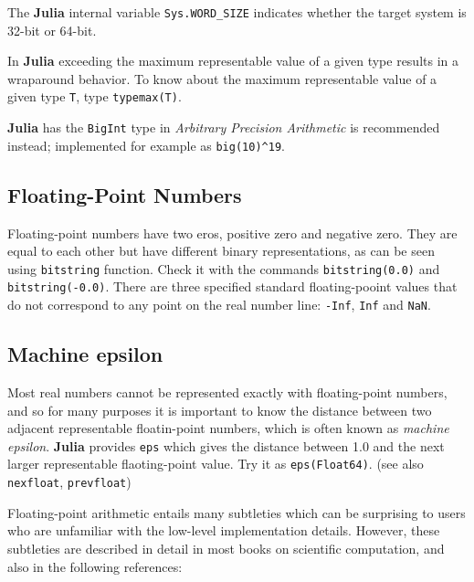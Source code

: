 \documentclass[
]{article}
\begin{document}
The \textbf{Julia} internal variable \texttt{Sys.WORD\_SIZE} indicates
whether the target system is 32-bit or 64-bit.

In \textbf{Julia} exceeding the maximum representable value of a given
type results in a wraparound behavior. To know about the maximum
representable value of a given type \texttt{T}, type
\texttt{typemax(T)}.

\textbf{Julia} has the \texttt{BigInt} type in \emph{Arbitrary Precision
Arithmetic} is recommended instead; implemented for example as
\texttt{big(10)\^{}19}.

\hypertarget{floating-point-numbers}{%
\subsection{Floating-Point Numbers}\label{floating-point-numbers}}

Floating-point numbers have two eros, positive zero and negative zero.
They are equal to each other but have different binary representations,
as can be seen using \texttt{bitstring} function. Check it with the
commands \texttt{bitstring(0.0)} and \texttt{bitstring(-0.0)}. There are
three specified standard floating-pooint values that do not correspond
to any point on the real number line: \texttt{-Inf}, \texttt{Inf} and
\texttt{NaN}.

\hypertarget{machine-epsilon}{%
\subsection{Machine epsilon}\label{machine-epsilon}}

Most real numbers cannot be represented exactly with floating-point
numbers, and so for many purposes it is important to know the distance
between two adjacent representable floatin-point numbers, which is often
known as \emph{machine epsilon}. \textbf{Julia} provides \texttt{eps}
which gives the distance between 1.0 and the next larger representable
flaoting-point value. Try it as \texttt{eps(Float64)}. (see also
\texttt{nexfloat}, \texttt{prevfloat})

Floating-point arithmetic entails many subtleties which can be
surprising to users who are unfamiliar with the low-level implementation
details. However, these subtleties are described in detail in most books
on scientific computation, and also in the following references:
\end{document}
